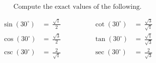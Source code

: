 $$
\text{Compute the exact values of the following.}
$$

$$
\begin{align*}
  \sin(30^{\circ}) &=\ \frac{\sqrt{1}}{2} \qquad&\qquad \cot(30^{\circ}) &=\ \frac{\sqrt{3}}{\sqrt{1}} \\[2ex]
  \cos(30^{\circ}) &=\ \frac{\sqrt{3}}{2} \qquad&\qquad \tan(30^{\circ}) &=\ \frac{\sqrt{1}}{\sqrt{3}} \\[2ex]
  \csc(30^{\circ}) &=\ \frac{2}{\sqrt{1}} \qquad&\qquad \sec(30^{\circ}) &=\ \frac{2}{\sqrt{3}}
\end{align*}
$$
